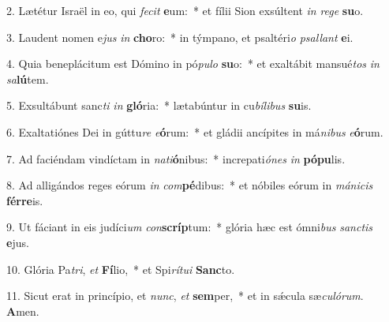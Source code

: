2. Lætétur Israël in eo, qui \textit{fe}\textit{cit} \textbf{e}um:~*  et fílii Sion exsúltent \textit{in} \textit{re}\textit{ge} \textbf{su}o.\

3. Laudent nomen e\textit{jus} \textit{in} \textbf{cho}ro:~*  in týmpano, et psaltéri\textit{o} \textit{psal}\textit{lant} \textbf{e}i.\

4. Quia beneplácitum est Dómino in pó\textit{pu}\textit{lo} \textbf{su}o:~*  et exaltábit mansué\textit{tos} \textit{in} \textit{sa}\textbf{lú}tem.\

5. Exsultábunt sanc\textit{ti} \textit{in} \textbf{gló}ria:~*  lætabúntur in cu\textit{bí}\textit{li}\textit{bus} \textbf{su}is.\

6. Exaltatiónes Dei in gúttu\textit{re} \textit{e}\textbf{ó}rum:~*  et gládii ancípites in má\textit{ni}\textit{bus} \textit{e}\textbf{ó}rum.\

7. Ad faciéndam vindíctam in \textit{na}\textit{ti}\textbf{ó}nibus:~*  increpati\textit{ó}\textit{nes} \textit{in} \textbf{pó}\textbf{pu}lis.\

8. Ad alligándos reges eórum \textit{in} \textit{com}\textbf{pé}dibus:~*  et nóbiles eórum in \textit{má}\textit{ni}\textit{cis} \textbf{fér}\textbf{re}is.\

9. Ut fáciant in eis judíci\textit{um} \textit{con}\textbf{scríp}tum:~*  glória hæc est ómni\textit{bus} \textit{sanc}\textit{tis} \textbf{e}jus.\

10. Glória Pa\textit{tri}, \textit{et} \textbf{Fí}lio,~*  et Spi\textit{rí}\textit{tu}\textit{i} \textbf{Sanc}to.\

11. Sicut erat in princípio, et \textit{nunc}, \textit{et} \textbf{sem}per,~*  et in sǽcula sæ\textit{cu}\textit{ló}\textit{rum}. \textbf{A}men.\

